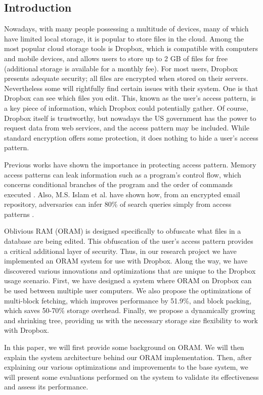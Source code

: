 \documentclass{article}
\begin{document}
\begin{multicols}{2}

\section{Introduction}
Nowadays, with many people possessing a multitude of devices, many of which have limited local storage, it is popular to store files in the cloud. Among the most popular cloud storage tools is Dropbox, which is compatible with computers and mobile devices, and allows users to store up to 2 GB of files for free (additional storage is available for a monthly fee).
For most users, Dropbox presents adequate security; all files are encrypted when stored on their servers. Nevertheless some will rightfully find certain issues with their system. One is that Dropbox can see which files you edit. This, known as the user’s access pattern, is a key piece of information, which Dropbox could potentially gather. Of course, Dropbox itself is trustworthy, but nowadays the US government has the power to request data from web services, and the access pattern may be included. While standard encryption offers some protection, it does nothing to hide a user’s access pattern.
\par Previous works have shown the importance in protecting access pattern. Memory access patterns can leak information such as a program’s control flow, which concerns conditional branches of the program and the order of commands executed \cite{Zhuang}. Also, M.S. Islam et al. have shown how, from an encrypted email repository, adversaries can infer 80\% of search queries simply from access patterns \cite{Islam}.
\par Oblivious RAM (ORAM) is designed specifically to obfuscate what files in a database are being edited. This obfuscation of the user’s access pattern provides a critical additional layer of security. Thus, in our research project we have implemented an ORAM system for use with Dropbox. Along the way, we have discovered various innovations and optimizations that are unique to the Dropbox usage scenario. First, we have designed a system where ORAM on Dropbox can be used between multiple user computers. We also propose the optimizations of multi-block fetching, which improves performance by 51.9\%, and block packing, which saves 50-70\% storage overhead. Finally, we propose a dynamically growing and shrinking tree, providing us with the necessary storage size flexibility to work with Dropbox.
\par In this paper, we will first provide some background on ORAM. We will then explain the system architecture behind our ORAM implementation. Then, after explaining our various optimizations and improvements to the base system, we will present some evaluations performed on the system to validate its effectiveness and assess its performance.


\end{multicols}
\end{document}

